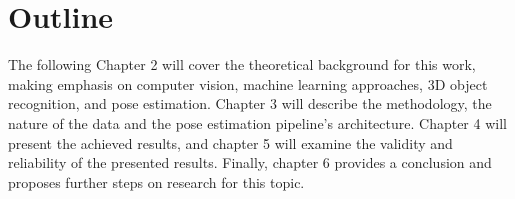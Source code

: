
\section{Outline}\label{chap:1:outline}
The following Chapter 2 will cover the theoretical background for this work, making emphasis on computer vision, machine learning approaches, 3D object recognition, and pose estimation. Chapter 3 will describe the methodology, the nature of the data and the pose estimation pipeline's architecture. Chapter 4 will present the achieved results, and chapter 5 will examine the validity and reliability of the presented results. Finally, chapter 6 provides a conclusion and proposes further steps on research for this topic.


        
        
